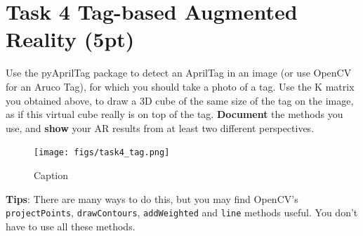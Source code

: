 \documentclass[english]{article}
\begin{document}
\clearpage

\section{Task 4 Tag-based Augmented Reality (5pt)}
Use the pyAprilTag package to detect an AprilTag in an image (or use OpenCV for an Aruco Tag), for which you should take a photo of a tag. Use the K matrix you obtained above, to draw a 3D cube of the same size of the tag on the image, as if this virtual cube really is on top of the tag. \textbf{Document} the methods you use, and \textbf{show} your AR results from at least two different perspectives.
\begin{figure}[h]
    \centering
    \texttt{[image: figs/task4\_tag.png]}
    \caption{Caption}
    \label{fig:tag before AR}
\end{figure}


\textbf{Tips}: There are many ways to do this, but you may find OpenCV's \texttt{projectPoints}, \texttt{drawContours}, \texttt{addWeighted} and \texttt{line} methods useful. You don't have to use all these methods.

\end{document}
